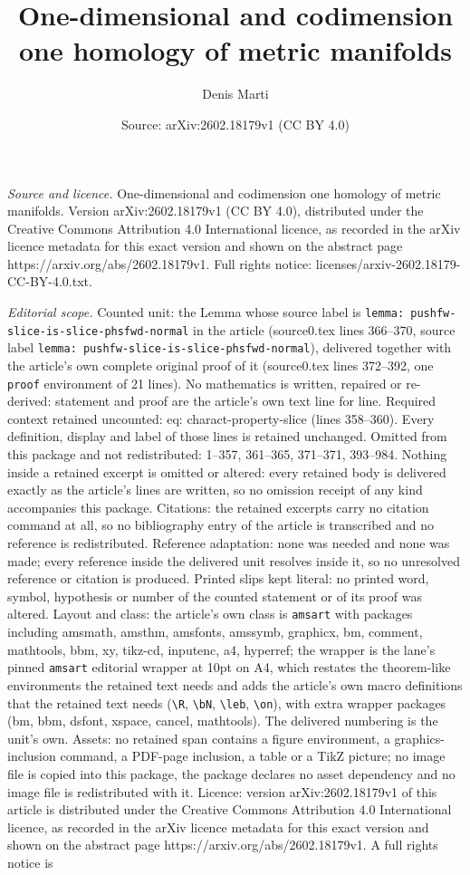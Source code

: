 \documentclass[10pt,a4paper]{amsart}
\title[One-dimensional and codimension one homology of metric manif]{One-dimensional and codimension one homology of metric manifolds}
\author{Denis Marti}
\date{Source: arXiv:2602.18179v1 (CC BY 4.0)}
\begin{document}
\maketitle

\noindent\emph{Source and licence.} One-dimensional and codimension one homology of metric manifolds. Version arXiv:2602.18179v1 (CC BY 4.0), distributed under the Creative Commons Attribution 4.0 International licence, as recorded in the arXiv licence metadata for this exact version and shown on the abstract page https://arxiv.org/abs/2602.18179v1. Full rights notice: licenses/arxiv-2602.18179-CC-BY-4.0.txt.\par\smallskip

\noindent\textit{Editorial scope.} Counted unit: the Lemma whose source label is \texttt{lemma: pushfw-slice-is-slice-phsfwd-normal} in the article (source0.tex lines 366--370, source label \texttt{lemma: pushfw-slice-is-slice-phsfwd-normal}), delivered together with the article's own complete original proof of it (source0.tex lines 372--392, one \texttt{proof} environment of 21 lines). No mathematics is written, repaired or re-derived: statement and proof are the article's own text line for line. Required context retained uncounted: eq: charact-property-slice (lines 358--360). Every definition, display and label of those lines is retained unchanged. Omitted from this package and not redistributed: 1--357, 361--365, 371--371, 393--984. Nothing inside a retained excerpt is omitted or altered: every retained body is delivered exactly as the article's lines are written, so no omission receipt of any kind accompanies this package. Citations: the retained excerpts carry no citation command at all, so no bibliography entry of the article is transcribed and no reference is redistributed. Reference adaptation: none was needed and none was made; every reference inside the delivered unit resolves inside it, so no unresolved reference or citation is produced. Printed slips kept literal: no printed word, symbol, hypothesis or number of the counted statement or of its proof was altered. Layout and class: the article's own class is \texttt{amsart} with packages including amsmath, amsthm, amsfonts, amssymb, graphicx, bm, comment, mathtools, bbm, xy, tikz-cd, inputenc, a4, hyperref; the wrapper is the lane's pinned \texttt{amsart} editorial wrapper at 10pt on A4, which restates the theorem-like environments the retained text needs and adds the article's own macro definitions that the retained text needs (\texttt{\textbackslash R}, \texttt{\textbackslash bN}, \texttt{\textbackslash leb}, \texttt{\textbackslash on}), with extra wrapper packages (bm, bbm, dsfont, xspace, cancel, mathtools). The delivered numbering is the unit's own. Assets: no retained span contains a figure environment, a graphics-inclusion command, a PDF-page inclusion, a table or a TikZ picture; no image file is copied into this package, the package declares no asset dependency and no image file is redistributed with it. Licence: version arXiv:2602.18179v1 of this article is distributed under the Creative Commons Attribution 4.0 International licence, as recorded in the arXiv licence metadata for this exact version and shown on the abstract page https://arxiv.org/abs/2602.18179v1. A full rights notice is 
\end{document}
